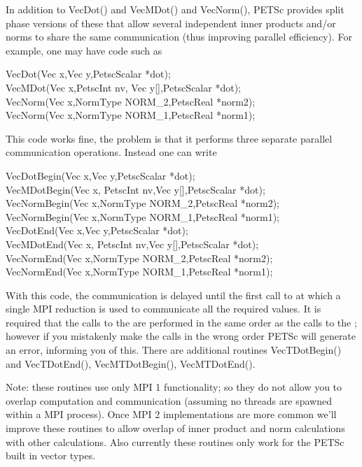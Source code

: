In addition to VecDot() and VecMDot() and VecNorm(), PETSc provides
split phase versions of these that allow several independent inner products and/or norms
to share the same communication (thus improving parallel efficiency). For example,
one may have code such as 
\begin{tabbing}
 VecDot(Vec x,Vec y,PetscScalar *dot);\\
 VecMDot(Vec x,PetscInt nv, Vec y[],PetscScalar *dot);\\
 VecNorm(Vec x,NormType NORM_2,PetscReal *norm2);\\
 VecNorm(Vec x,NormType NORM_1,PetscReal *norm1);
\end{tabbing}
This code works fine, the problem is that it performs three separate parallel communication
operations. Instead one can write 
\begin{tabbing}
 VecDotBegin(Vec x,Vec y,PetscScalar *dot);\\
 VecMDotBegin(Vec x, PetscInt nv,Vec y[],PetscScalar *dot);\\
 VecNormBegin(Vec x,NormType NORM_2,PetscReal *norm2);\\
 VecNormBegin(Vec x,NormType NORM_1,PetscReal *norm1);\\
 VecDotEnd(Vec x,Vec y,PetscScalar *dot);\\
 VecMDotEnd(Vec x, PetscInt nv,Vec y[],PetscScalar *dot);\\
 VecNormEnd(Vec x,NormType NORM_2,PetscReal *norm2);\\
 VecNormEnd(Vec x,NormType NORM_1,PetscReal *norm1);
\end{tabbing}
With this code, 
the communication is delayed until the first call to 
 at which 
a single MPI reduction is used to communicate all the required values. It is required that the
calls to the  are performed in the same order as the calls to the 
; however if you mistakenly make the calls in the wrong order PETSc
will generate an error,
informing you of this. There are additional routines VecTDotBegin() and 
VecTDotEnd(), VecMTDotBegin(), VecMTDotEnd(). 

Note: these routines use only MPI 1 functionality; so they do not allow you to overlap 
computation and communication (assuming no threads are spawned within a MPI process). 
Once MPI 2 implementations are more common we'll improve these
routines to allow overlap of inner product and norm calculations with other calculations.
Also currently these routines only work for the PETSc built in vector types.

